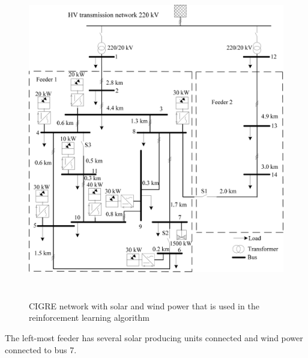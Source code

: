 \documentclass[class=book, crop=false]{standalone}
\begin{document}
\begin{figure}[H]
    \includegraphics[height=14cm, width=13.5cm]{figures/cigre_network_mv_der.png}
    \caption[size = 9]{CIGRE network with solar and wind power that is used in the reinforcement learning algorithm}
    \label{fig:problem:cigre_network}
\end{figure}
The left-most feeder has several solar producing units connected and wind power connected to bus 7. 
\end{document}
